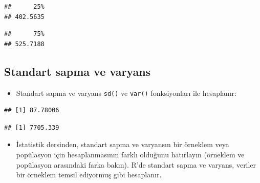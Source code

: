 \documentclass[
  oneside]{book}
\newenvironment{Shaded}{\begin{snugshade}}{\end{snugshade}}
\newcommand{\CommentTok}[1]{\textcolor[rgb]{0.56,0.35,0.01}{\textit{#1}}}
\newcommand{\FloatTok}[1]{\textcolor[rgb]{0.00,0.00,0.81}{#1}}
\newcommand{\FunctionTok}[1]{\textcolor[rgb]{0.13,0.29,0.53}{\textbf{#1}}}
\newcommand{\NormalTok}[1]{#1}
\newcommand{\SpecialCharTok}[1]{\textcolor[rgb]{0.81,0.36,0.00}{\textbf{#1}}}
\providecommand{\tightlist}{%
  \setlength{\itemsep}{0pt}\setlength{\parskip}{0pt}}
\begin{document}
\begin{verbatim}
##      25% 
## 402.5635
\end{verbatim}

\begin{Shaded}
\end{Shaded}

\begin{verbatim}
##      75% 
## 525.7188
\end{verbatim}

\hypertarget{standart-sapma-ve-varyans}{%
\subsection{Standart sapma ve varyans}\label{standart-sapma-ve-varyans}}

\begin{itemize}
\tightlist
\item
  Standart sapma ve varyans \texttt{sd()} ve \texttt{var()} fonksiyonları ile hesaplanır:
\end{itemize}

\begin{Shaded}
\end{Shaded}

\begin{verbatim}
## [1] 87.78006
\end{verbatim}

\begin{Shaded}
\end{Shaded}

\begin{verbatim}
## [1] 7705.339
\end{verbatim}

\begin{itemize}
\tightlist
\item
  İstatistik dersinden, standart sapma ve varyansın bir örneklem veya popülasyon için hesaplanmasının farklı olduğunu hatırlayın (örneklem ve popülasyon arasındaki farka bakın). R'de standart sapma ve varyans, veriler bir örneklem temsil ediyormuş gibi hesaplanır.
\end{itemize}
\end{document}
